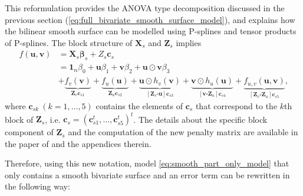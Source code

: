 This reformulation provides the ANOVA type decomposition discussed in the previous section 
(\ref{eq:full_bivariate_smooth_surface_model}), and explains how the bilinear smooth surface can be modelled using P-splines and 
tensor products of P-splines.
The block structure of $\mathbf{X}_s$ and $\mathbf{Z}_s$ implies
\begin{equation}
    \begin{aligned} 
        f(\boldsymbol{u}, \boldsymbol{v}) & =\boldsymbol{X}_{s} \boldsymbol{\beta}_{s}+Z_{s} \boldsymbol{c}_{s} \\ 
        								  & =\mathbf{1}_{n} \beta_{0}+\boldsymbol{u} \beta_{1}+\boldsymbol{v} \beta_{2}+
        								  \boldsymbol{u} \odot \boldsymbol{v} \beta_{3} \\
        								  & + \underbrace{f_{v}(\boldsymbol{v})}_{\boldsymbol{Z}_{v} \boldsymbol{c}_{s 1}}+
        								  \underbrace{f_{u}(\boldsymbol{u})}_{\boldsymbol{Z}_{u} \boldsymbol{c}_{s 2}} +
        								  \underbrace{\boldsymbol{u} \odot h_{v}(\boldsymbol{v})}_{\left[\boldsymbol{Z}_{v} 
        								  \square \boldsymbol{u}\right] \boldsymbol{c}_{s 3}}+\underbrace{\boldsymbol{v} \odot 
        								  h_{u}(\boldsymbol{u})}_{\left[\boldsymbol{v} \square \boldsymbol{Z}_{u}\right] 
        								  \boldsymbol{c}_{s 4}} +\underbrace{f_{u, v}(\boldsymbol{u}, \boldsymbol{v})}
        								  _{\left[\boldsymbol{Z}_{v} \square \boldsymbol{Z}_{u}\right] \boldsymbol{c}_{s 5}}
        								  \text{,}
    \end{aligned}
\end{equation}
where $\boldsymbol{c}_{sk} \ (k = 1,\ldots,5)$ contains the elements of $\boldsymbol{c}_s$ that correspond to the $k$th block of $\boldsymbol{Z}_s$, i.e. $\boldsymbol{c}_s = (\boldsymbol{c}_{s1}^t,\ldots,\boldsymbol{c}_{s5}^t)^t$. The details about the specific block component of $\boldsymbol{Z}_s$ and the computation of the new penalty matrix are available in the paper of \textcite{rodriguez-alvarez_correcting_2018} and the appendices therein.

Therefore, using this new notation, model \ref{eq:smooth_part_only_model} that only contains a smooth bivariate surface and an error term can be rewritten in the following way:

